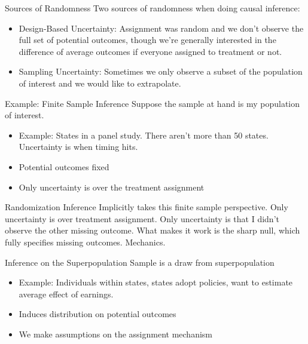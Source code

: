 \documentclass[aspectratio=169, handout]{beamer}
\begin{document}
{\footnotesize
\begin{frame}{Sources of Randomness}
Two sources of randomness when doing causal inference:
\begin{itemize}
  \item \alert{Design}-Based Uncertainty:
    Assignment was random and we don't observe the full set of potential
    outcomes, though we're generally interested in the difference of
    average outcomes if \alert{everyone} assigned to treatment or not.
  \item \alert{Sampling} Uncertainty:
    Sometimes we only observe a subset of the population of interest and
    we would like to extrapolate.
\end{itemize}
\end{frame}
}


{\footnotesize
\begin{frame}{Example: Finite Sample Inference}
Suppose the sample at hand is my population of interest.
\begin{itemize}
  \item Example: States in a panel study. There aren't more than 50
    states. Uncertainty is when timing hits.
  \item Potential outcomes fixed
  \item Only uncertainty is over the treatment assignment
\end{itemize}
\end{frame}
}


{\footnotesize
\begin{frame}{Randomization Inference}
Implicitly takes this finite sample perspective.
Only uncertainty is over treatment assignment.
Only uncertainty is that I didn't observe the other missing outcome.
What makes it work is the sharp null, which fully specifies missing
outcomes.
Mechanics.
\end{frame}
}


{\footnotesize
\begin{frame}{Inference on the Superpopulation}
Sample is a draw from superpopulation
\begin{itemize}
  \item Example: Individuals within states, states adopt policies, want
    to estimate average effect of earnings.
  \item Induces distribution on potential outcomes
  \item We make assumptions on the assignment mechanism
\end{itemize}
\end{frame}
}
\end{document}
